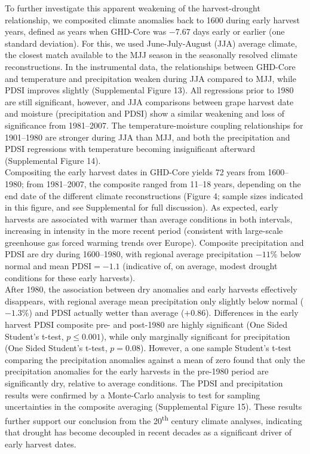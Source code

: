 \documentclass[final]{nature}
\begin{document}
\indent To further investigate this apparent weakening of the harvest-drought relationship, we composited climate anomalies back to 1600 during early harvest years, defined as years when GHD-Core was $-7.67$ days early or earlier (one standard deviation). For this, we used June-July-August (JJA) average climate, the closest match available to the MJJ season in the seasonally resolved climate reconstructions. In the instrumental data, the relationships between GHD-Core and temperature and precipitation weaken during JJA compared to MJJ, while PDSI improves slightly (Supplemental Figure 13). All regressions prior to 1980 are still significant, however, and JJA comparisons between grape harvest date and moisture (precipitation and PDSI) show a similar weakening and loss of significance from 1981--2007. The temperature-moisture coupling relationships for 1901--1980 are stronger during JJA than MJJ, and both the precipitation and PDSI regressions with temperature becoming insignificant afterward (Supplemental Figure 14).\\ 
\indent Compositing the early harvest dates in GHD-Core yields 72 years from 1600--1980; from 1981--2007, the composite ranged from 11--18 years, depending on the end date of the different climate reconstructions (Figure 4; sample sizes indicated in this figure, and see Supplemental for full discussion). As expected, early harvests are associated with warmer than average conditions in both intervals, increasing in intensity in the more recent period (consistent with large-scale greenhouse gas forced warming trends over Europe). Composite precipitation and PDSI are dry during 1600--1980, with regional average precipitation $-11\%$ below normal and mean PDSI$=-1.1$ (indicative of, on average, modest drought conditions for these early harvests).\\
\indent After 1980, the association between dry anomalies and early harvests effectively disappears, with regional average mean precipitation only slightly below normal ($-1.3\%$) and PDSI actually wetter than average ($+0.86$). Differences in the early harvest PDSI composite pre- and post-1980 are highly significant (One Sided Student's t-test, $p\le0.001$), while only marginally significant for precipitation (One Sided Student's t-test, $p=0.08$). However, a one sample Student's t-test comparing the precipitation anomalies against a mean of zero found that only the precipitation anomalies for the early harvests in the pre-1980 period are significantly dry, relative to average conditions. The PDSI and precipitation results were confirmed by a Monte-Carlo analysis to test for sampling uncertainties in the composite averaging (Supplemental Figure 15). These results further support our conclusion from the 20\textsuperscript{th} century climate analyses, indicating that drought has become decoupled in recent decades as a significant driver of early harvest dates.\\
\end{document}
